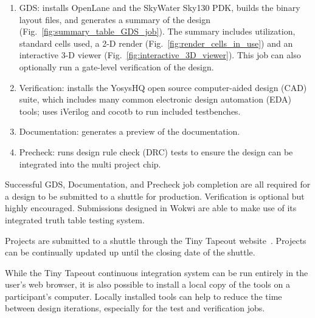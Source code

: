 \begin{enumerate}
	\item GDS: installs OpenLane\cite{openlane} and the SkyWater Sky130\cite{skywaterpdk} PDK, builds the binary layout files, and generates a summary of the design (Fig.~\ref{fig:summary_table_GDS_job}). The summary includes utilization, standard cells used, a 2-D render (Fig.~\ref{fig:render_cells_in_use}) and an interactive 3-D viewer (Fig.~\ref{fig:interactive_3D_viewer}).
This job can also optionally run a gate-level verification of the design.
	\item Verification: installs the YosysHQ open source computer-aided design (CAD) suite, which includes many common electronic design automation (EDA) tools; uses iVerilog\cite{iverilog} and cocotb\cite{cocotb} to run included testbenches.
	\item Documentation: generates a preview of the documentation.
	\item Precheck: runs design rule check (DRC) tests to ensure the design can be integrated into the multi project chip.
\end{enumerate}

Successful GDS, Documentation, and Precheck job completion are all required for a design to be submitted to a shuttle for production.
Verification is optional but highly encouraged. Submissions designed in Wokwi are able to make use of its integrated truth table testing system\cite{automatedtesting}.

Projects are submitted to a shuttle through the Tiny Tapeout website~\cite{tinytapeout}. Projects can be continually updated up until the closing date of the shuttle.

While the Tiny Tapeout continuous integration system can be run entirely in the user's web browser, it is also possible to install a local copy of the tools\cite{localinstall} on a participant's computer. Locally installed tools can help to reduce the time between design iterations, especially for the test and verification jobs.

